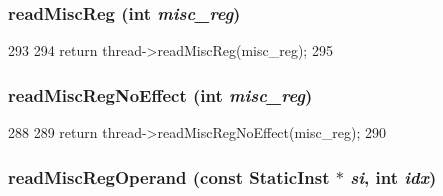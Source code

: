 \hypertarget{classCheckerCPU_a5a8c6c487e8da143d26188258b04f1cc}{
\subsubsection[{readMiscReg}]{ readMiscReg (int {\em misc\_\-reg})}}
\label{classCheckerCPU_a5a8c6c487e8da143d26188258b04f1cc}



\begin{DoxyCode}
293     {
294         return thread->readMiscReg(misc_reg);
295     }
\end{DoxyCode}
\hypertarget{classCheckerCPU_a7b5ac6af9c2c19d7c1b442b8a3aebbc6}{
\subsubsection[{readMiscRegNoEffect}]{ readMiscRegNoEffect (int {\em misc\_\-reg})}}
\label{classCheckerCPU_a7b5ac6af9c2c19d7c1b442b8a3aebbc6}



\begin{DoxyCode}
288     {
289         return thread->readMiscRegNoEffect(misc_reg);
290     }
\end{DoxyCode}
\hypertarget{classCheckerCPU_ac6d0dc1a63cede82f4242d43236a98db}{
\subsubsection[{readMiscRegOperand}]{ readMiscRegOperand (const {\bf StaticInst} $\ast$ {\em si}, \/  int {\em idx})}}
\label{classCheckerCPU_ac6d0dc1a63cede82f4242d43236a98db}




